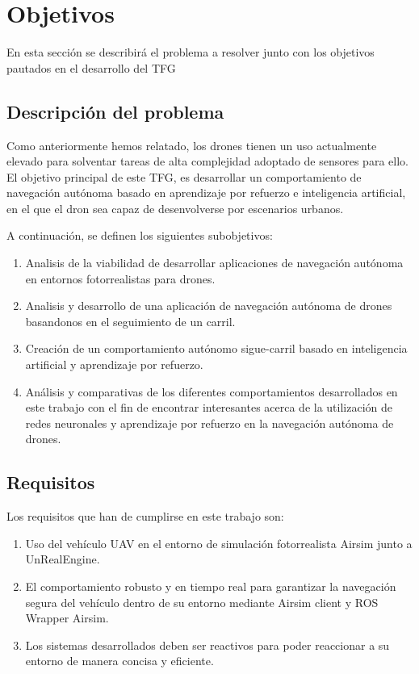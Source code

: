 \chapter{Objetivos}
\label{cap:capitulo2}


En esta sección se describirá el problema a resolver junto con los objetivos pautados en el desarrollo del TFG


\section{Descripción del problema}
\label{sec:descripcion}

Como anteriormente hemos relatado, los drones tienen un uso actualmente elevado para solventar tareas de alta complejidad adoptado de sensores 
para ello. \\

El objetivo principal de este TFG, es desarrollar un comportamiento de navegación autónoma basado en aprendizaje por refuerzo e 
inteligencia artificial, en el que el dron sea capaz de desenvolverse por escenarios urbanos. \newline

A continuación, se definen los siguientes subobjetivos: 

\begin{enumerate}
    \item Analisis de la viabilidad de desarrollar aplicaciones de navegación autónoma en entornos fotorrealistas para drones.
    \item Analisis y desarrollo de una aplicación de navegación autónoma de drones basandonos en el seguimiento de un carril.
    \item Creación de un comportamiento autónomo sigue-carril basado en inteligencia artificial y aprendizaje por refuerzo. 
    \item Análisis y comparativas de los diferentes comportamientos desarrollados en este trabajo con el fin de encontrar interesantes acerca de la utilización de redes neuronales y aprendizaje por refuerzo en la navegación autónoma de drones.
\end{enumerate}
\newpage
\section{Requisitos}
\label{sec:requisitos}

Los requisitos que han de cumplirse en este trabajo son: 
\begin{enumerate}
    \item Uso del vehículo UAV en el entorno de simulación fotorrealista Airsim junto a UnRealEngine.
    \item El comportamiento robusto y en tiempo real para garantizar la navegación segura del vehículo dentro de su entorno mediante Airsim client y ROS Wrapper Airsim. 
    \item Los sistemas desarrollados deben ser reactivos para poder reaccionar a su entorno de manera concisa y eficiente.
\end{enumerate}


